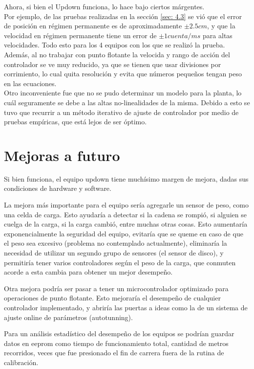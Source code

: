 Ahora, si bien el Updown funciona, lo hace bajo ciertos márgentes.\\
Por ejemplo, de las pruebas realizadas en la sección \ref{sec: 4.3} se vió que el error de posición en régimen permanente es de aproximadamente \( \pm 2.5cm \), y que la velocidad en régimen permanente tiene un error de \( \pm 1 cuenta/ms \) para altas velocidades. Todo esto para los 4 equipos con los que se realizó la prueba. \\
Además, al no trabajar con punto flotante la velocida y rango de acción del controlador se ve muy reducido, ya que se tienen que usar divisiones por corrimiento, lo cual quita resolución y evita que números pequeños tengan peso en las ecuaciones.\\

Otro inconveniente fue que no se pudo determinar un modelo para la planta, lo cuál seguramente se debe a las altas no-linealidades de la misma. Debido a esto se tuvo que recurrir a un método iterativo de ajuste de controlador por medio de pruebas empíricas, que está lejos de ser óptimo.
 
\section{Mejoras a futuro} \label{sec:\thesection}

Si bien funciona, el equipo updown tiene muchísimo margen de mejora, dadas sus condiciones de hardware y software. 

La mejora más importante para el equipo sería agregarle un sensor de peso, como una celda de carga. Esto ayudaría a detectar si la cadena se rompió, si alguien se cuelga de la carga, si la carga cambió, entre muchas otras cosas. Esto aumentaría exponencialmente la seguridad del equipo, evitaría que se queme en caso de que el peso sea excesivo (problema no contemplado actualmente), eliminaría la necesidad de utilizar un segundo grupo de sensores (el sensor de disco), y permitiría tener varios controladores según el peso de la carga, que conmuten acorde a esta cambia para obtener un mejor desempeño.

Otra mejora podría ser pasar a tener un microcontrolador optimizado para operaciones de punto flotante. Esto mejoraría el desempeño de cualquier controlador implementado, y abriría las puertas a ideas como la de un sistema de ajuste online de parámetros (autotunning).

Para un análisis estadístico del desempeño de los equipos se podrían guardar datos en eeprom como tiempo de funcionamiento total, cantidad de metros recorridos, veces que fue presionado el fin de carrera fuera de la rutina de calibración.

